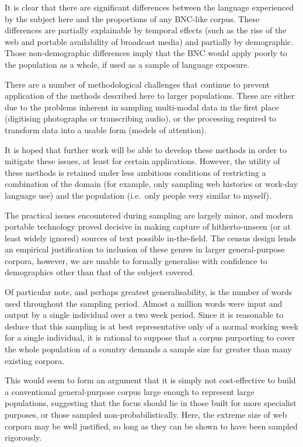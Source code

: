 It is clear that there are significant differences between the language experienced by the subject here and the proportions of any BNC-like corpus.  These differences are partially explainable by temporal effects (such as the rise of the web and portable availability of broadcast media) and partially by demographic.  Those non-demographic differences imply that the BNC would apply poorly to the population as a whole, if used as a sample of language exposure.

There are a number of methodological challenges that continue to prevent application of the methods described here to larger populations.  These are either due to the problems inherent in sampling multi-modal data in the first place (digitising photographs or transcribing audio), or the processing required to transform data into a usable form (models of attention).

It is hoped that further work will be able to develop these methods in order to mitigate these issues, at least for certain applications.  However, the utility of these methods is retained under less ambitious conditions of restricting a combination of the domain (for example, only sampling web histories or work-day language use) and the population (i.e.\ only people very similar to myself).

The practical issues encountered during sampling are largely minor, and modern portable technology proved decisive in making capture of hitherto-unseen (or at least widely ignored) sources of text possible in-the-field.  The census design lends an empirical justification to inclusion of these genres in larger general-purpose corpora, however, we are unable to formally generalise with confidence to demographics other than that of the subject covered.

Of particular note, and perhaps greatest generalisability, is the number of words used throughout the sampling period.  Almost a million words were input and output by a single individual over a two week period.  Since it is reasonable to deduce that this sampling is at best representative only of a normal working week for a single individual, it is rational to suppose that a corpus purporting to cover the whole population of a country demands a sample size far greater than many existing corpora.


This would seem to form an argument that it is simply not cost-effective to build a conventional general-purpose corpus large enough to represent large populations, suggesting that the focus should lie in those built for more specialist purposes, or those sampled non-probabilistically.  Here, the extreme size of web corpora may be well justified, so long as they can be shown to have been sampled rigorously.


